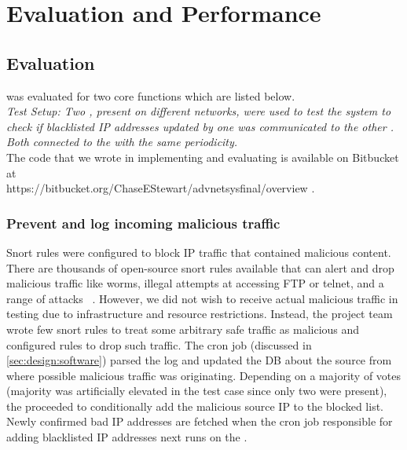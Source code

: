 \section{Evaluation and Performance}
\label{sec:eval}
\subsection{Evaluation}


\sysname was evaluated for two core functions which are listed below.\\
\textit{Test Setup: Two \nodenames, present on different networks, were used to test the system to check if blacklisted IP addresses updated by one \nodename was communicated to the other \nodename. Both \nodenames connected to the \servname with the same periodicity.} \\
The code that we wrote in implementing and evaluating \sysname is available on Bitbucket at \\ https://bitbucket.org/ChaseEStewart/advnetsysfinal/overview \cite{us}.
\subsubsection{Prevent and log incoming malicious traffic}
\label{sec:eval:preventout}

 Snort rules were configured to block IP traffic that contained malicious content. There are thousands of open-source snort rules available that can alert and drop malicious traffic like worms, illegal attempts at accessing FTP or telnet, and a range of attacks ~\cite{Roesch:1999:SLI:1039834.1039864}. However, we did not wish to receive actual malicious traffic in testing due to infrastructure and resource restrictions. Instead, the project team wrote few snort rules to treat some arbitrary safe traffic as malicious and configured rules to drop such traffic. 
The cron job (discussed in \ref{sec:design:software}) parsed the log and updated the DB about the source from where possible malicious traffic was originating. Depending on a majority of votes (majority was artificially elevated in the test case since only two \nodenames were present), the \servname proceeded to conditionally add the malicious source IP to the blocked list. Newly confirmed bad IP addresses are fetched when the cron job responsible for adding blacklisted IP addresses next runs on the \nodenames. %


